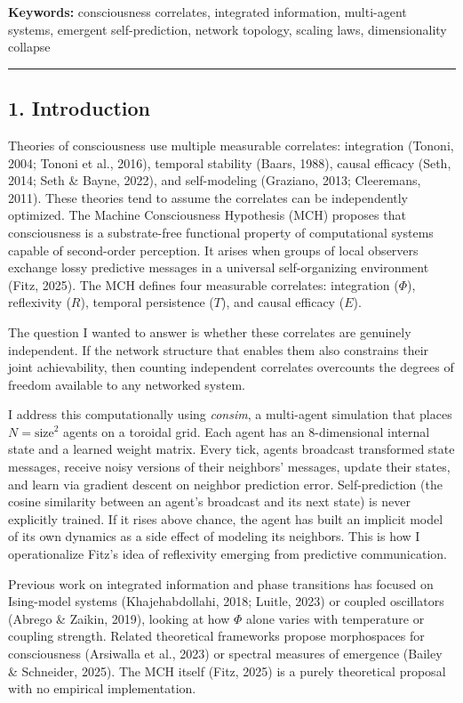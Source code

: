 \documentclass[
  11pt,
]{article}
\begin{document}
\textbf{Keywords:} consciousness correlates, integrated information,
multi-agent systems, emergent self-prediction, network topology, scaling
laws, dimensionality collapse

\begin{center}\rule{0.5\linewidth}{0.5pt}\end{center}

\subsection{1. Introduction}\label{introduction}

Theories of consciousness use multiple measurable correlates:
integration (Tononi, 2004; Tononi et al., 2016), temporal stability
(Baars, 1988), causal efficacy (Seth, 2014; Seth \& Bayne, 2022), and
self-modeling (Graziano, 2013; Cleeremans, 2011). These theories tend to
assume the correlates can be independently optimized. The Machine
Consciousness Hypothesis (MCH) proposes that consciousness is a
substrate-free functional property of computational systems capable of
second-order perception. It arises when groups of local observers
exchange lossy predictive messages in a universal self-organizing
environment (Fitz, 2025). The MCH defines four measurable correlates:
integration (\(\Phi\)), reflexivity (\(R\)), temporal persistence
(\(T\)), and causal efficacy (\(E\)).

The question I wanted to answer is whether these correlates are
genuinely independent. If the network structure that enables them also
constrains their joint achievability, then counting independent
correlates overcounts the degrees of freedom available to any networked
system.

I address this computationally using \emph{consim}, a multi-agent
simulation that places \(N = \text{size}^2\) agents on a toroidal grid.
Each agent has an 8-dimensional internal state and a learned weight
matrix. Every tick, agents broadcast transformed state messages, receive
noisy versions of their neighbors' messages, update their states, and
learn via gradient descent on neighbor prediction error. Self-prediction
(the cosine similarity between an agent's broadcast and its next state)
is never explicitly trained. If it rises above chance, the agent has
built an implicit model of its own dynamics as a side effect of modeling
its neighbors. This is how I operationalize Fitz's idea of reflexivity
emerging from predictive communication.

Previous work on integrated information and phase transitions has
focused on Ising-model systems (Khajehabdollahi, 2018; Luitle, 2023) or
coupled oscillators (Abrego \& Zaikin, 2019), looking at how \(\Phi\)
alone varies with temperature or coupling strength. Related theoretical
frameworks propose morphospaces for consciousness (Arsiwalla et al.,
2023) or spectral measures of emergence (Bailey \& Schneider, 2025). The
MCH itself (Fitz, 2025) is a purely theoretical proposal with no
empirical implementation.
\end{document}
